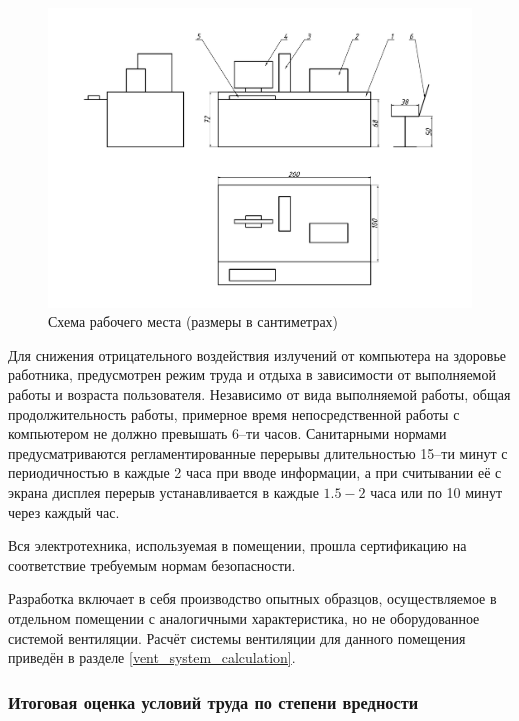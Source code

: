 \begin{figure}[ht!]
    \centering
    \includegraphics[width=\textwidth, keepaspectratio, clip=true, trim=0mm 10mm 0mm 15mm]
                    {./src/ecology/pictures/workplace_scheme}
    \caption{Схема рабочего места (размеры в сантиметрах)}
    \label{pic_workplace_scheme}
\end{figure}

Для снижения отрицательного воздействия излучений от компьютера
на здоровье работника, предусмотрен режим труда и отдыха в зависимости от выполняемой
работы и возраста пользователя. Независимо от вида выполняемой работы, общая
продолжительность работы, примерное время непосредственной работы с компьютером
не должно превышать 6--ти часов. Санитарными нормами предусматриваются регламентированные
перерывы длительностью 15--ти минут с периодичностью в каждые 2 часа при вводе
информации, а при считывании её с экрана дисплея перерыв устанавливается в
каждые $1.5 - 2$ часа или по 10 минут через каждый час.

Вся электротехника, используемая в помещении, прошла сертификацию на соответствие
требуемым нормам безопасности.

Разработка включает в себя производство опытных образцов, осуществляемое в отдельном
помещении с аналогичными характеристика, но не оборудованное системой вентиляции.
Расчёт системы вентиляции для данного помещения приведён в разделе \ref{vent_system_calculation}.



\subsubsection{Итоговая оценка условий труда по степени вредности}

